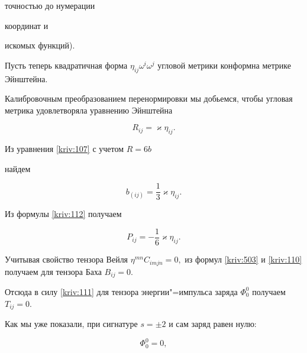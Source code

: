 точностью до нумерации 

координат и 

искомых функций).



\smallskip






Пусть теперь квадратичная форма $\eta _{ij}\omega

^{i}\omega ^{j}$  угловой метрики конформна метрике Эйнштейна. 

Калибровочным преобразованием перенормировки мы добьемся,  чтобы угловая метрика удовлетворяла уравнению Эйнштейна

\begin{equation}

R_{ij}=\varkappa \eta _{ij}.  

\label{kriv:501}

\end{equation}

Из уравнения \eqref{kriv:107} с учетом $R=6b$

найдем

\begin{equation}

b_{\left( ij\right) }=\frac{1}{3}\varkappa \eta _{ij}.  

\label{kriv:502}

\end{equation}

Из формулы \eqref{kriv:112} получаем

\begin{equation}

P_{ij}=-\frac{1}{6}\varkappa \eta _{ij}.  

\label{kriv:503}

\end{equation}



Учитывая свойство тензора Вейля $\eta ^{mn}C_{imjn}=0,$ из формул \eqref{kriv:503} и \eqref{kriv:110} получаем для тензора Баха $B_{ij}=0.$ 

Отсюда в силу \eqref{kriv:111}  для тензора  энергии"=импульса заряда $\Phi _{0}^{0}$ получаем $T_{ij}=0.$ 

Как мы уже показали, при сигнатуре $s=\pm 2$ и сам заряд равен нулю:

\begin{equation}

\Phi _{0}^{0}=0,  

\label{kriv:504}

\end{equation}

